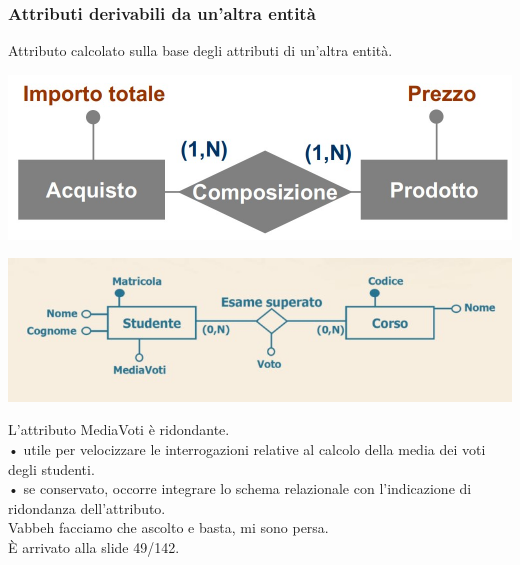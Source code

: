\subsubsection{Attributi derivabili da un'altra entità}
Attributo calcolato sulla base degli attributi di un'altra entità.
\begin{center}
    \includegraphics[scale=0.675]{chaptersLezioniSara/img/PLog_ridondanze2.jpg}
\end{center}
\begin{center}
    \includegraphics[scale=0.675]{chaptersLezioniSara/img/PLog_ridondanze3.jpg}
\end{center}
L'attributo MediaVoti è ridondante.\\
• utile per velocizzare le interrogazioni relative al calcolo della media dei voti degli studenti.\\
• se conservato, occorre integrare lo schema relazionale con l'indicazione di ridondanza dell'attributo.\\

Vabbeh facciamo che ascolto e basta, mi sono persa.\\
\`E arrivato alla slide 49/142.






